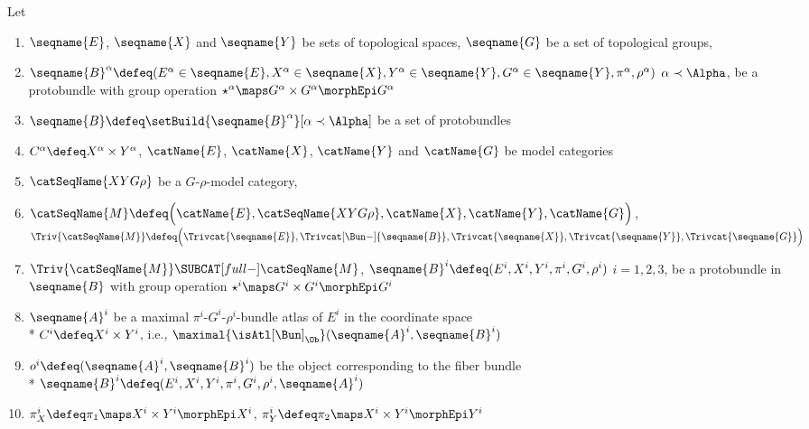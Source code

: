\documentclass{article}
\begin{document}
\begin{theorem}
\label{the:BunLCS}
Let
\begin{enumerate}
\item
$\seqname{E}$, $\seqname{X}$ and $\seqname{Y}$ be sets of
topological spaces, $\seqname{G}$ be a set of topological groups,
\item
$
  \seqname{B}^\alpha \defeq
  (
    E^\alpha \in \seqname{E},
    X^\alpha \in \seqname{X},
    Y^\alpha \in \seqname{Y},
    G^\alpha \in \seqname{Y},
    \pi^\alpha,
    \rho^\alpha
  )
$
$\alpha \prec \Alpha$, be a protobundle with group operation
$\star^\alpha \maps G^\alpha \times G^\alpha \morphEpi G^\alpha$
\item
$\seqname{B} \defeq \setBuild{{\seqname{B}^\alpha}}[\alpha \prec \Alpha]$
be a set of protobundles
\item
$C^\alpha \defeq X^\alpha \times Y^\alpha$,
$\catName{E}$, $\catName{X}$, $\catName{Y}$ and $\catName{G}$ be model
categories
\item
$\catSeqName{XYG\rho}$ be a $G$-$\rho$-model category,
\item
$
  \catSeqName{M} \defeq
   \Bigl  (
      \catName{E},
      \catSeqName{XYG\rho},
      \catName{X},
      \catName{Y},
      \catName{G}
   \Bigr  )
$,
$
  \Triv{\catSeqName{M}} \defeq
    \Bigl  (
      \Trivcat{\seqname{E}},
      \Trivcat[\Bun-]{\seqname{B}},
      \Trivcat{\seqname{X}},
      \Trivcat{\seqname{Y}},
      \Trivcat{\seqname{G}}
    \Bigr  )
$
\item
$\Triv{\catSeqName{M}} \SUBCAT[full-] \catSeqName{M}$,
$
  \seqname{B}^i \defeq
  (
    E^i,
    X^i,
    Y^i,
    \pi^i,
    G^i,
    \rho^i
  )
$
$i=1,2,3$, be a protobundle in $\seqname{B}$
with group operation $\star^i \maps G^i \times G^i \morphEpi G^i$
\item
$\seqname{A}^i$ be a maximal $\pi^i$-$G^i$-$\rho^i$-bundle atlas of
$E^i$ in the coordinate space \\*
$C^i \defeq X^i \times Y^i$, i.e.,
$\maximal{\isAtl[\Bun]_\Ob} (\seqname{A}^i, \seqname{B}^i)$
\item
$o^i \defeq (\seqname{A}^i, \seqname{B}^i)$ be the object corresponding
to the fiber bundle \\*
$
  \seqname{B}^i \defeq
  (
    E^i,
    X^i,
    Y^i,
    \pi^i,
    G^i,
    \rho^i,
    \seqname{A}^i
  )
$
\item
$\pi^i_X \defeq \pi_1 \maps X^i \times Y^i \morphEpi X^i$,
$\pi^i_Y \defeq \pi_2 \maps X^i \times Y^i \morphEpi Y^i$

\end{enumerate}
\end{theorem}
\end{document}

